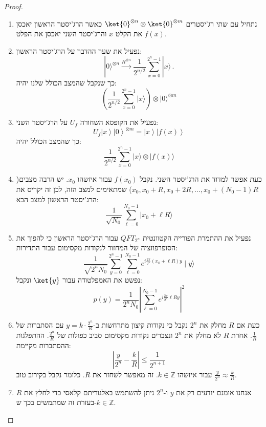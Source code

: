 \documentclass{tstextbook}
\begin{document}
\begin{proof}
  \begin{enumerate}
    \item נתחיל עם שתי רג'יסטרים \(\ket{0}^{\otimes n}\otimes \ket{0}^{\otimes m}\) כאשר הרג'יסטר הראשון יאכסן את הקלט \(x\) והרג'יסטר השני יאכסן את הפלט \(f(x)\). 


    \item נפעיל את שער ההדבר על הרג'יסטר הראשון: 
$$|0\rangle^{\otimes n}\xrightarrow{H^{\otimes n}}\frac{1}{2^{n/2}}\sum_{x=0}^{2^{n}-1}|x\rangle\,.$$
כך שנקבל שהמצב הכולל שלנו יהיה:
$$\left({\frac{1}{2^{n/2}}}\sum_{x=0}^{2^{n}-1}|x\rangle\right)\otimes|0\rangle^{\otimes m}$$


    \item נפעיל את הקופסא השחורה \(U_{f}\) על הרג'יסטר השני: 
$$U_{f}\left|x\right\rangle\left|0\right\rangle^{\otimes m}=\left|x\right\rangle\left|f(x)\right\rangle$$
כך שהמצב הכולל יהיה:
$${\frac{1}{2^{n/2}}}\sum_{x=0}^{2^{n}-1}|x\rangle\otimes|f(x)\rangle$$


    \item כעת אפשר למדוד את הרג'יסטר השני. נקבל \(f(x_{0})\) עבור איזשהו \(x_{0}\). יש הרבה מצבים(\(x_{0},x_{0}+R,x_{0}+2R, \dots,x_{0}+(N_{0}-1)R\)) שמתאימים למצב הזה, לכן זה יקריס את הרג'יסטר הראשון למצב הבא: 
$$\frac{1}{\sqrt{N_{0}}}\sum_{\ell=0}^{N_{0}-1}|x_{0}+\ell R\rangle$$


    \item נפעיל את ההתמרת הפורייה הקטוונטית \(QFT_{2^{n}}\) עבור הרג'יסטר הראשון כי להפוך את הסופרפוזציה של המחזור לנקודות מקסימום עבור התדירות: 
$$\frac{1}{\sqrt{2^{n}N_{0}}}\sum_{y=0}^{2^{n}-1}\sum_{\ell=0}^{N_{0}-1}e^{i\frac{2\pi}{2^{n}}(x_{0}+\ell R)y}\mid\!\!y\!\rangle$$
נפשט את האמפלטודה עבור \(\ket{y}\) ונקבל:
$$p(y)=\frac{1}{2^{n}N_{0}}\left|\sum_{\ell=0}^{N_{0}-1}e^{i\frac{2\pi}{2^{n}}\ell R y}\right|^{2}$$


    \item כעת אם \(R\) מחלק את \(2^{n}\) נקבל כי נקודות קיצון מתרחשות ב-\(y=k\cdot \frac{2^{n}}{R}\) עם הסתברות של \(\frac{1}{R}\). אחרת \(R\) לא מחלק את \(2^{n}\) ונצברים נקודות מקסימום סביב כפולות של \(\frac{2^{n}}{R}\). ההתפלגות ההסתברות מקיימת: 
$$\left|{\frac{y}{2^{n}}}-{\frac{k}{R}}\right|\leq{\frac{1}{2^{n+1}}}$$
עבור איזשהו \(k \in \mathbb{Z}\). זה מאפשר לשחזר את \(R\). כלומר נקבל בקירוב טוב \(\frac{y}{2^{n}}\approx \frac{k}{R}\).


    \item אנחנו אומנם יודעים רק את \(y\) ו-\(2^{n}\) ניתן להשתמש באלגוריתם קלאסי כדי לחלץ את \(R\) בעזרת זה שמתמשים בכך ש-\(k \in \mathbb{Z}\). 


  \end{enumerate}
\end{proof}
\end{document}
